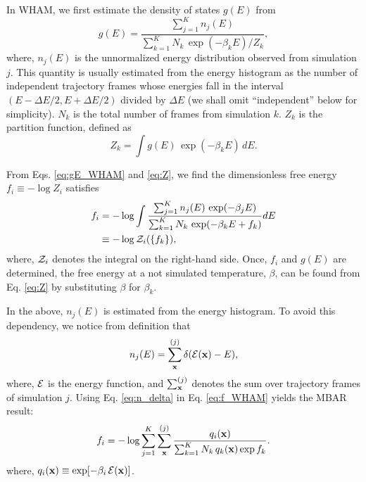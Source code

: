 \documentclass[reprint,superscriptaddress]{revtex4-1}
\begin{document}
In WHAM,
we first estimate the density of states $g(E)$ from
%
\begin{equation}
g(E)
=
\frac{
  \sum_{j = 1}^K n_j(E)
}
{
  \sum_{k = 1}^K N_k \, \exp(-\beta_k E) / Z_k
},
\label{eq:gE_WHAM}
\end{equation}
%
where,
$n_j(E)$
is the unnormalized energy distribution
observed from simulation $j$.
%
This quantity is usually estimated
from the energy histogram as
the number of independent trajectory frames
whose energies fall in the interval
$(E - \Delta E/2, E + \Delta E/2)$
divided by $\Delta E$
(we shall omit ``independent'' below for simplicity).
%
$N_k$
is the total number of frames
from simulation $k$.
%
$Z_k$
is the partition function,
defined as
%
\begin{equation}
Z_k
=
\int g(E) \, \exp(-\beta_k E) \, dE.
\label{eq:Z}
\end{equation}




From Eqs. \eqref{eq:gE_WHAM} and \eqref{eq:Z},
we find the dimensionless free energy
$f_i \equiv -\log Z_i$
satisfies
\begin{align}
f_i
&=
-\log
  \int
    \frac{
      \sum_{j = 1}^K n_j(E) \, \exp(-\beta_j E)
    }
    {
      \sum_{k = 1}^K N_k \, \exp(-\beta_k E + f_k)
    }
    dE
\label{eq:f_WHAM}
\\
&\equiv
-\log \mathcal{Z}_i(\{ f_k \}),
\notag
\end{align}
%
where,
$\mathcal{Z}_i$
denotes the integral on the right-hand side.
%
Once, $f_i$ and $g(E)$ are determined,
the free energy at a not simulated temperature, $\beta$,
can be found from Eq. \eqref{eq:Z}
by substituting $\beta$ for $\beta_k$.



In the above,
$n_j(E)$ is estimated from the energy histogram.
%
To avoid this dependency,
we notice from definition that
%
\begin{equation}
n_j(E)
=
\sum_{\mathbf{x}}^{(j)} \delta(\mathcal{E}(\mathbf{x}) - E),
\label{eq:n_delta}
\end{equation}
%
where,
$\mathcal{E}$
is the energy function,
and
$\sum_{\mathbf{x}}^{(j)}$
denotes the sum over trajectory frames
of simulation $j$.
%
%
%
Using Eq. \eqref{eq:n_delta} in Eq. \eqref{eq:f_WHAM} yields
the MBAR\cite{shirts2008} result:
%
\begin{equation}
f_i
=
-\log
\sum_{j = 1}^K
\sum_{\mathbf{x}}^{(j)}
\frac{
  q_i(\mathbf{x})
}
{
  \sum_{k = 1}^K N_k \, q_k(\mathbf{x}) \exp f_k
}.
\label{eq:f_MBAR}
\end{equation}
%
where,
$q_i(\mathbf{x}) \equiv \exp[ -\beta_i \, \mathcal{E}(\mathbf{x}) ]$.
\end{document}
